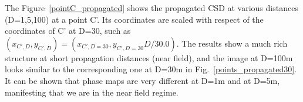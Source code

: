 \documentclass{iucr}              %
\newcommand{\todo}[1]{{\color{red}[TODO: "#1'']}}
\newcommand{\inblue}[1]{{\color{blue}#1}}
\begin{document}
% 


The Figure~\ref{pointC_propagated} shows the propagated CSD at various distances (D=1,5,100) at a point C'. Its coordinates are scaled with respect of the coordinates of C' at D=30, such as $(x_{C',D},y_{C',D})=(x_{C',D=30},y_{C',D=30} D / 30.0)$. The results show a much rich structure at short propagation distances (near field), and the image at D=100m looks similar to the corresponding one at D=30m in \inblue{Fig.~\ref{points_propagated30}}. It can be shown that phase maps are very different at D=1m and at D=5m, manifesting that we are in the near field regime.   
\end{document}
